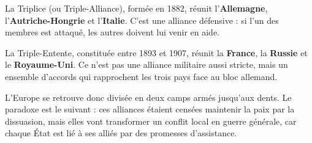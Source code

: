 \documentclass[11pt]{article}
\newcommand{\cle}[1]{{\popxbold\color{popdark}#1}}
\begin{document}
\begin{definition}
La \cle{Triplice} (ou Triple-Alliance), formée en 1882, réunit l'\textbf{Allemagne}, l'\textbf{Autriche-Hongrie} et l'\textbf{Italie}. C'est une alliance défensive : si l'un des membres est attaqué, les autres doivent lui venir en aide.

La \cle{Triple-Entente}, constituée entre 1893 et 1907, réunit la \textbf{France}, la \textbf{Russie} et le \textbf{Royaume-Uni}. Ce n'est pas une alliance militaire aussi stricte, mais un ensemble d'accords qui rapprochent les trois pays face au bloc allemand.
\end{definition}

L'Europe se retrouve donc divisée en deux camps armés jusqu'aux dents. Le paradoxe est le suivant : ces alliances étaient censées maintenir la paix par la dissuasion, mais elles vont transformer un conflit local en guerre générale, car chaque État est lié à ses alliés par des promesses d'assistance.
\end{document}
